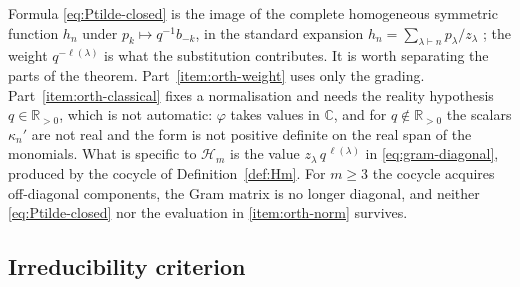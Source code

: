 \documentclass[12pt]{amsart}
\theoremstyle{plain}
\theoremstyle{definition}
\newcommand{\CC}{\mathbb{C}}
\newcommand{\RR}{\mathbb{R}}
\newcommand{\Hm}{{\mathcal{H}_m}}     %
\begin{document}
Formula \eqref{eq:Ptilde-closed} is the image of the complete homogeneous
symmetric function $h_n$ under $p_k \mapsto q^{-1}b_{-k}$, in the standard
expansion $h_n = \sum_{\lambda \vdash n} p_\lambda / z_\lambda$
\cite[Ch.~I, (2.14)]{Macdonald1995}; the weight $q^{-\ell(\lambda)}$ is
what the substitution contributes. It is worth separating the parts of
the theorem. Part~\ref{item:orth-weight} uses only the grading.
Part~\ref{item:orth-classical} fixes a normalisation and needs the
reality hypothesis $q \in \RR_{>0}$, which is not automatic: $\varphi$
takes values in $\CC$, and for $q \notin \RR_{>0}$ the scalars
$\kappa_n'$ are not real and the form is not positive definite on the
real span of the monomials. What is specific to $\Hm$ is the value
$z_\lambda\,q^{\,\ell(\lambda)}$ in \eqref{eq:gram-diagonal}, produced by
the cocycle of Definition~\ref{def:Hm}. For $m \geq 3$ the cocycle acquires
off-diagonal components, the Gram matrix is no longer diagonal, and
neither \eqref{eq:Ptilde-closed} nor the evaluation in
\ref{item:orth-norm} survives.

\subsection{Irreducibility criterion}
\label{subsec:irreducibility}
\end{document}
